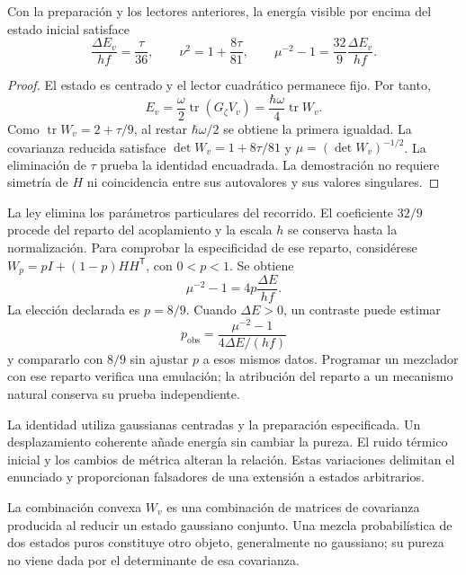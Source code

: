 \begin{proposition}
\label{md:aux:prop-energia-pureza}
Con la preparación y los lectores anteriores, la energía
visible por encima del estado inicial satisface
\begin{equation}
 \frac{\Delta E_v}{hf}=\frac\tau{36},\qquad
 \nu^2=1+\frac{8\tau}{81},\qquad
 \boxed{\mu^{-2}-1=\frac{32}{9}\frac{\Delta E_v}{hf}.}
 \label{md:aux:identidad-energia-pureza}
\end{equation}
\end{proposition}
\begin{proof}
El estado es centrado y el lector cuadrático permanece fijo.
Por tanto,
\[
 E_v=\frac\omega2\operatorname{tr}(G_\zeta V_v)
 =\frac{\hbar\omega}{4}\operatorname{tr}W_v.
\]
Como $\operatorname{tr}W_v=2+\tau/9$, al restar
$\hbar\omega/2$ se obtiene la primera igualdad.
La covarianza reducida satisface
$\det W_v=1+8\tau/81$ y $\mu=(\det W_v)^{-1/2}$.
La eliminación de $\tau$ prueba la identidad encuadrada.
La demostración no requiere simetría de $H$ ni coincidencia
entre sus autovalores y sus valores singulares.
\end{proof}

La ley elimina los parámetros particulares del recorrido.
El coeficiente $32/9$ procede del reparto del acoplamiento
y la escala $h$ se conserva hasta la normalización.
Para comprobar la especificidad de ese reparto, considérese
$W_p=pI+(1-p)HH^{\mathsf T}$, con $0<p<1$. Se obtiene
\begin{equation}
 \mu^{-2}-1=4p\frac{\Delta E}{hf}.
 \label{md:aux:reparto-general}
\end{equation}
La elección declarada es $p=8/9$. Cuando $\Delta E>0$,
un contraste puede estimar
\begin{equation}
 p_{\mathrm{obs}}=
 \frac{\mu^{-2}-1}{4\Delta E/(hf)}
 \label{md:aux:reparto-observado}
\end{equation}
y compararlo con $8/9$ sin ajustar $p$ a esos mismos datos.
Programar un mezclador con ese reparto verifica una
emulación; la atribución del reparto a un mecanismo natural
conserva su prueba independiente.

La identidad utiliza gaussianas centradas y la preparación
especificada. Un desplazamiento coherente añade energía sin
cambiar la pureza. El ruido térmico inicial y los cambios de
métrica alteran la relación. Estas variaciones delimitan el
enunciado y proporcionan falsadores de una extensión a estados
arbitrarios.

La combinación convexa $W_v$ es una combinación de matrices
de covarianza producida al reducir un estado gaussiano conjunto.
Una mezcla probabilística de dos estados puros constituye
otro objeto, generalmente no gaussiano; su pureza no viene
dada por el determinante de esa covarianza.

